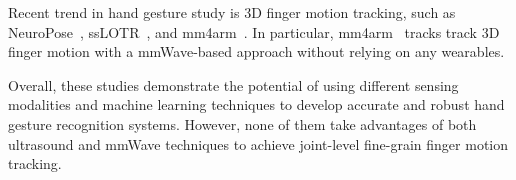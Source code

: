\documentclass[11pt, oneside]{article}   	%
\begin{document}
Recent trend in hand gesture study is 3D finger motion tracking, such as NeuroPose~\cite{ref:neuropose21}, ssLOTR~\cite{ref:sslotr22}, and mm4arm~\cite{ref:mm4arm23}. In particular, mm4arm~\cite{ref:mm4arm23} tracks track 3D finger motion with a mmWave-based approach without relying on any wearables.


Overall, these studies demonstrate the potential of using different sensing modalities and machine learning techniques to develop accurate and robust hand gesture recognition systems. However, none of them take advantages of both ultrasound and mmWave techniques to achieve joint-level fine-grain finger motion tracking.




\end{document}
